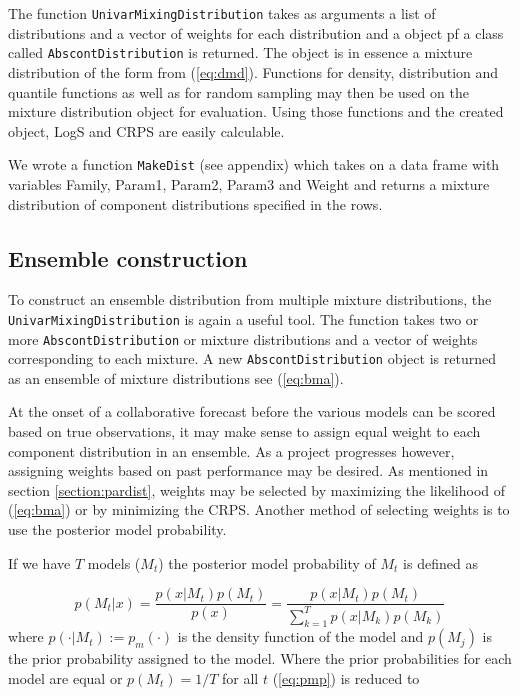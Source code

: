 \documentclass{article}\usepackage[]{graphicx}\usepackage[]{color}
\begin{document}
The function 
\texttt{UnivarMixingDistribution} takes as arguments a list of distributions
and a vector of weights for each distribution and a object pf a class called 
\texttt{AbscontDistribution} is returned. The object is in essence a mixture
distribution of the form from (\ref{eq:dmd}). Functions for density, 
distribution
and quantile functions as well as for random sampling may then be used on the
mixture distribution object for evaluation. Using those functions and the 
created object, LogS and CRPS are easily calculable. 

We wrote a function \texttt{MakeDist} (see appendix)
which takes on a data frame with variables
Family, Param1, Param2, Param3 and Weight and returns a mixture distribution 
of component distributions specified in the rows.



\subsection{Ensemble construction}

To construct an ensemble distribution from multiple mixture distributions, the 
\texttt{UnivarMixingDistribution} is again a useful tool. The function takes 
two or more
\texttt{AbscontDistribution} or mixture distributions and a vector of weights 
corresponding to each mixture. A new \texttt{AbscontDistribution} object is 
returned as an ensemble of mixture distributions see (\ref{eq:bma}). 

At the onset of a collaborative forecast before the various models can be scored
based on true observations, it may make sense to assign equal weight to each 
component distribution in an ensemble. As a project progresses however, 
assigning weights based on past performance may be desired. As mentioned in 
section \ref{section:pardist}, weights may be selected by maximizing the
likelihood of (\ref{eq:bma}) or by minimizing the CRPS. Another method of 
selecting weights is to use the posterior model probability. 

If we have $T$ models ($M_t$) the posterior model probability of $M_t$ is 
defined as 

\begin{equation}
\label{eq:pmp}
p(M_t|x) = \frac{p(x|M_t)p(M_t)}{p(x)}
         = \frac{p(x|M_t)p(M_t)}{\sum_{k=1}^T p(x|M_k)p(M_k)}
\end{equation}
where $p(\cdot |M_t) := p_m(\cdot)$ is the density function of the model and 
$p(M_j)$ is the prior probability assigned to the model. Where the prior
probabilities for each model are equal or $p(M_t) = 1/T$ for all $t$ 
(\ref{eq:pmp}) is reduced to 
\end{document}
